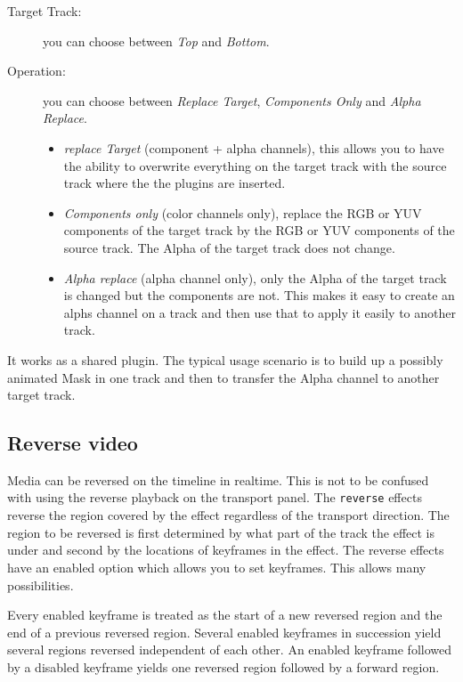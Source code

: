 \begin{description}
	\item[Target Track:] you can choose between \textit{Top} and \textit{Bottom}.
	\item[Operation:] you can choose between \textit{Replace Target},  \textit{Components Only} and \textit{Alpha Replace}.
	\begin{itemize}
		\item \textit{replace Target} (component + alpha channels), this allows you to have the ability to overwrite everything on the target track with the source track where the the plugins are inserted.
		\item \textit{Components only} (color channels only), replace the RGB or YUV components of the target track by the RGB or YUV components of the source track. The Alpha of the target track does not change.
		\item \textit{Alpha replace} (alpha channel only), only the Alpha of the target track is changed but the components are not. This makes it easy to create an alphs channel on a track and then use that to apply it easily to another track.
	\end{itemize}   
\end{description}

It works as a shared plugin. The typical usage scenario is to build up a possibly animated Mask in one track and then to transfer the Alpha channel to another target track.

\subsection{Reverse video}%
\label{sub:reverse_video}

Media can be reversed on the timeline in realtime. This is not to be confused with using the reverse playback on the transport panel. The \texttt{reverse} effects reverse the region covered by the effect regardless of the transport direction. The region to be reversed is first determined by what part of the track the effect is under and second by the locations of keyframes in the effect. The reverse effects have an enabled option which allows you to set keyframes. This allows many possibilities.

Every enabled keyframe is treated as the start of a new reversed region and the end of a previous reversed region. Several enabled keyframes in succession yield several regions reversed independent of each other. An enabled keyframe followed by a disabled keyframe yields one reversed region followed by a forward region.

